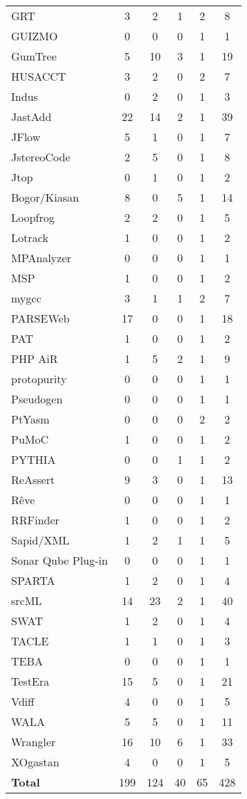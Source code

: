 \begin{longtable}{ l c c c c c }
   GRT & 3 & 2 & 1 & 2 & 8 \\
   GUIZMO & 0 & 0 & 0 & 1 & 1 \\
   GumTree & 5 & 10 & 3 & 1 & 19 \\
   HUSACCT & 3 & 2 & 0 & 2 & 7 \\
   Indus & 0 & 2 & 0 & 1 & 3 \\
   JastAdd & 22 & 14 & 2 & 1 & 39 \\
   JFlow & 5 & 1 & 0 & 1 & 7 \\
   JstereoCode & 2 & 5 & 0 & 1 & 8 \\
   Jtop & 0 & 1 & 0 & 1 & 2 \\
   Bogor/Kiasan & 8 & 0 & 5 & 1 & 14 \\
   Loopfrog & 2 & 2 & 0 & 1 & 5 \\
   Lotrack & 1 & 0 & 0 & 1 & 2 \\
   MPAnalyzer & 0 & 0 & 0 & 1 & 1 \\
   MSP & 1 & 0 & 0 & 1 & 2 \\
   mygcc & 3 & 1 & 1 & 2 & 7 \\
   PARSEWeb & 17 & 0 & 0 & 1 & 18 \\
   PAT & 1 & 0 & 0 & 1 & 2 \\
   PHP AiR & 1 & 5 & 2 & 1 & 9 \\
   protopurity & 0 & 0 & 0 & 1 & 1 \\
   Pseudogen & 0 & 0 & 0 & 1 & 1 \\
   PtYasm & 0 & 0 & 0 & 2 & 2 \\
   PuMoC & 1 & 0 & 0 & 1 & 2 \\
   PYTHIA & 0 & 0 & 1 & 1 & 2 \\
   ReAssert & 9 & 3 & 0 & 1 & 13 \\
   Rêve & 0 & 0 & 0 & 1 & 1 \\
   RRFinder & 1 & 0 & 0 & 1 & 2 \\
   Sapid/XML & 1 & 2 & 1 & 1 & 5 \\
   Sonar Qube Plug-in & 0 & 0 & 0 & 1 & 1 \\
   SPARTA & 1 & 2 & 0 & 1 & 4 \\
   srcML & 14 & 23 & 2 & 1 & 40 \\
   SWAT & 1 & 2 & 0 & 1 & 4 \\
   TACLE & 1 & 1 & 0 & 1 & 3 \\
   TEBA & 0 & 0 & 0 & 1 & 1 \\
   TestEra & 15 & 5 & 0 & 1 & 21 \\
   Vdiff & 4 & 0 & 0 & 1 & 5 \\
   WALA & 5 & 5 & 0 & 1 & 11 \\
   Wrangler & 16 & 10 & 6 & 1 & 33 \\
   XOgastan & 4 & 0 & 0 & 1 & 5 \\
  \hline
  {\bf Total} & 199 & 124 & 40 & 65 & 428 \\
\end{longtable}
